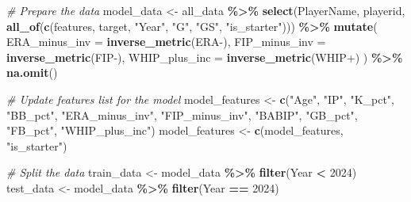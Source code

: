 \documentclass[
]{article}
\newenvironment{Shaded}{\begin{snugshade}}{\end{snugshade}}
\newcommand{\AttributeTok}[1]{\textcolor[rgb]{0.13,0.29,0.53}{#1}}
\newcommand{\CommentTok}[1]{\textcolor[rgb]{0.56,0.35,0.01}{\textit{#1}}}
\newcommand{\DecValTok}[1]{\textcolor[rgb]{0.00,0.00,0.81}{#1}}
\newcommand{\FunctionTok}[1]{\textcolor[rgb]{0.13,0.29,0.53}{\textbf{#1}}}
\newcommand{\NormalTok}[1]{#1}
\newcommand{\OtherTok}[1]{\textcolor[rgb]{0.56,0.35,0.01}{#1}}
\newcommand{\SpecialCharTok}[1]{\textcolor[rgb]{0.81,0.36,0.00}{\textbf{#1}}}
\newcommand{\StringTok}[1]{\textcolor[rgb]{0.31,0.60,0.02}{#1}}
\begin{document}
\begin{Shaded}
\begin{Highlighting}[]
\CommentTok{\# Prepare the data}
\NormalTok{model\_data }\OtherTok{\textless{}{-}}\NormalTok{ all\_data }\SpecialCharTok{\%\textgreater{}\%}
  \FunctionTok{select}\NormalTok{(PlayerName, playerid, }\FunctionTok{all\_of}\NormalTok{(}\FunctionTok{c}\NormalTok{(features, target, }\StringTok{"Year"}\NormalTok{, }\StringTok{"G"}\NormalTok{, }\StringTok{"GS"}\NormalTok{, }\StringTok{"is\_starter"}\NormalTok{))) }\SpecialCharTok{\%\textgreater{}\%}
  \FunctionTok{mutate}\NormalTok{(}
    \AttributeTok{ERA\_minus\_inv =} \FunctionTok{inverse\_metric}\NormalTok{(}\StringTok{\textasciigrave{}}\AttributeTok{ERA{-}}\StringTok{\textasciigrave{}}\NormalTok{),}
    \AttributeTok{FIP\_minus\_inv =} \FunctionTok{inverse\_metric}\NormalTok{(}\StringTok{\textasciigrave{}}\AttributeTok{FIP{-}}\StringTok{\textasciigrave{}}\NormalTok{),}
    \AttributeTok{WHIP\_plus\_inc =} \FunctionTok{inverse\_metric}\NormalTok{(}\StringTok{\textasciigrave{}}\AttributeTok{WHIP+}\StringTok{\textasciigrave{}}\NormalTok{)}
\NormalTok{  ) }\SpecialCharTok{\%\textgreater{}\%}
  \FunctionTok{na.omit}\NormalTok{()}
\end{Highlighting}
\end{Shaded}

\begin{Shaded}
\begin{Highlighting}[]
\CommentTok{\# Update features list for the model}
\NormalTok{model\_features }\OtherTok{\textless{}{-}} \FunctionTok{c}\NormalTok{(}\StringTok{"Age"}\NormalTok{, }\StringTok{"IP"}\NormalTok{, }\StringTok{"K\_pct"}\NormalTok{, }\StringTok{"BB\_pct"}\NormalTok{, }\StringTok{"ERA\_minus\_inv"}\NormalTok{, }\StringTok{"FIP\_minus\_inv"}\NormalTok{, }\StringTok{"BABIP"}\NormalTok{, }\StringTok{"GB\_pct"}\NormalTok{, }\StringTok{"FB\_pct"}\NormalTok{, }\StringTok{"WHIP\_plus\_inc"}\NormalTok{)}
\NormalTok{model\_features }\OtherTok{\textless{}{-}} \FunctionTok{c}\NormalTok{(model\_features, }\StringTok{"is\_starter"}\NormalTok{)}
\end{Highlighting}
\end{Shaded}

\begin{Shaded}
\begin{Highlighting}[]
\CommentTok{\# Split the data}
\NormalTok{train\_data }\OtherTok{\textless{}{-}}\NormalTok{ model\_data }\SpecialCharTok{\%\textgreater{}\%} \FunctionTok{filter}\NormalTok{(Year }\SpecialCharTok{\textless{}} \DecValTok{2024}\NormalTok{)}
\NormalTok{test\_data }\OtherTok{\textless{}{-}}\NormalTok{ model\_data }\SpecialCharTok{\%\textgreater{}\%} \FunctionTok{filter}\NormalTok{(Year }\SpecialCharTok{==} \DecValTok{2024}\NormalTok{)}
\end{Highlighting}
\end{Shaded}
\end{document}
